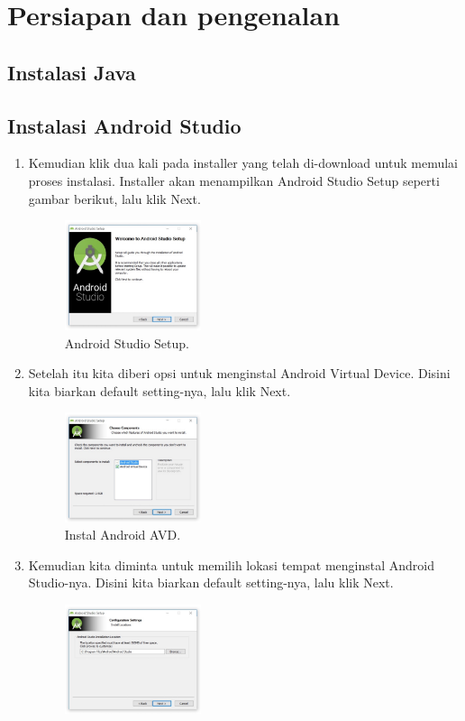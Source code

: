\section{Persiapan dan pengenalan}
\subsection{Instalasi Java}
\subsection{Instalasi Android Studio}
\begin{enumerate}
	\item Kemudian klik dua kali pada installer yang telah di-download untuk memulai proses instalasi. Installer akan menampilkan Android Studio Setup seperti gambar berikut, lalu klik Next. 
	\begin{figure}[H]
		\includegraphics[width=4cm]{figures/installas/1.jpg}
		\centering
		\caption{Android Studio Setup.}
	\end{figure}
	\item Setelah itu kita diberi opsi untuk menginstal Android Virtual Device. Disini kita biarkan default setting-nya, lalu klik Next.
	\begin{figure}[H]
		\includegraphics[width=4cm]{figures/installas/2.jpg}
		\centering
		\caption{Instal Android AVD.}
	\end{figure}
	\item Kemudian kita diminta untuk memilih lokasi tempat menginstal Android Studio-nya. Disini kita biarkan default setting-nya, lalu klik Next.
	\begin{figure}[H]
		\includegraphics[width=4cm]{figures/installas/3.jpg}

\end{figure}
\end{enumerate}
